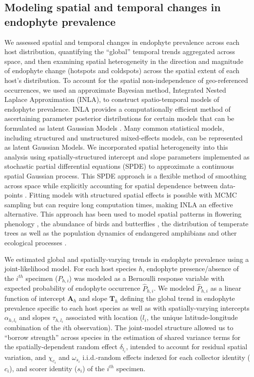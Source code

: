 \documentclass[11pt]{article}
\let\cite\citep
\newcommand{\tom}[2]{{\color{red}{#1}}\footnote{\textit{\color{red}{#2}}}}
\begin{document}
\subsection*{Modeling spatial and temporal changes in endophyte prevalence}
We assessed spatial and temporal changes in endophyte prevalence across each host distribution, quantifying the ``global'' temporal trends aggregated across space, and then examining spatial heterogeneity in the direction and magnitude of endophyte change (hotspots and coldspots) across the spatial extent of each host's distribution.
To account for the spatial non-independence of geo-referenced occurrences, we used an approximate Bayesian method, Integrated Nested Laplace Approximation (INLA), to construct spatio-temporal models of endophyte prevalence.
INLA provides a computationally efficient method of ascertaining parameter posterior distributions for certain models that can be formulated as latent Gaussian Models \cite{rue2009approximate}.
Many common statistical models, including structured and unstructured mixed-effects models, can be represented as latent Gaussian Models.
We incorporated spatial heterogeneity into this analysis using spatially-structured intercept and slope parameters implemented as stochastic partial differential equations (SPDE) to approximate a continuous spatial Gaussian process. 
This SPDE approach is a flexible method of smoothing across space while explicitly accounting for spatial dependence between data-points \citep{lindgren2011explicit,bakka2018spatial}.
Fitting models with structured spatial effects is possible with MCMC sampling but can require long computation times, making INLA an effective alternative. 
This approach has been used to model spatial patterns in flowering phenology \cite{willems2022forest}, the abundance of birds \cite{meehan2019spatial} and butterflies \cite{crossley2022opposing}, the distribution of temperate trees \cite{engel2022spatial} as well as the population dynamics of endangered amphibians \cite{knapp2016large} and other ecological processes \cite{beguin2012hierarchical}.

We estimated global and spatially-varying trends in endophyte prevalence using a joint-likelihood model. 
For each host species $h$, endophyte presence/absence of the $i^{th}$ specimen ($P_{h,i}$) was modeled as a Bernoulli response variable with expected probability of endophyte occurrence $\hat{P}_{h,i}$.
We modeled $\hat{P}_{h,i}$ as a linear function of intercept $\boldsymbol{A}_h$ and slope $\boldsymbol{T}_{h}$ defining the global trend in endophyte prevalence specific to each host species as well as with spatially-varying intercepts $\alpha_{h,l_{i}} $ and slopes $\tau_{h,l_i}$ associated with location ($l_i$, the unique latitude-longitude combination of the $i$th observation).
The joint-model structure allowed us to ``borrow strength'' across species in the estimation of shared variance terms for the spatially-dependent random effect $\delta_{l_i}$, intended to account for residual spatial variation, and $\chi_{c_i}$ and $\omega_{s_i}$ i.i.d.-random effects indexed for each collector identity ($c_i$), and scorer identity ($s_i$) of the $i^{th}$ specimen.
\end{document}
